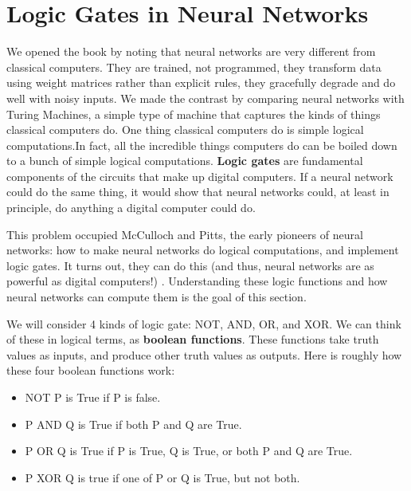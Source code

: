 \chapter{Logic Gates in Neural Networks}\label{ch_logicgates}




We opened the book by noting that neural networks are very different from classical computers. They are trained, not programmed, they transform data using weight matrices rather than explicit rules, they gracefully degrade and do well with noisy inputs. We made the contrast by comparing neural networks with Turing Machines, a simple type of machine that captures the kinds of things classical computers do. One thing classical computers do is simple logical computations.In fact, all the incredible things computers do can be boiled down to a bunch of simple logical computations. \textbf{Logic gates} are fundamental components of the circuits that make up digital computers. If a neural network could do the same thing, it would show that neural networks could, at least in principle, do anything a digital computer could do.

This problem occupied McCulloch and Pitts, the early pioneers of neural networks: how to make neural networks do logical computations, and implement logic gates. It turns out, they can do this  (and thus, neural networks are as powerful as digital computers!) \cite{mcculloch1943logical}. Understanding these logic functions and how neural networks can compute them is the goal of this section.

We will consider 4 kinds of logic gate: NOT, AND, OR, and XOR. We can think of these in logical terms, as \textbf{boolean functions}. These functions take truth values as inputs, and produce other truth values as outputs. Here is roughly how these four boolean functions work:

\begin{itemize}
\item NOT P is True if P is false.
\item P AND Q is True if both P and Q are True.
\item P OR Q is True if P is True, Q is True, or both P and Q are True.
\item P XOR Q is true if one of P or Q is True, but not both.
\end{itemize}

